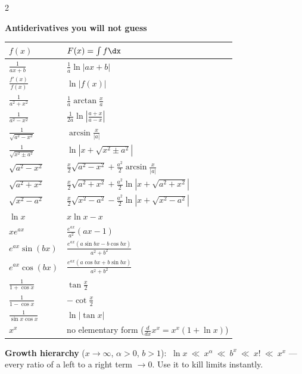 \begin{multicols}{2}
\columnbreak

{\fontsize{6.2pt}{7.3pt}\selectfont
\renewcommand{\arraystretch}{1.12}
\begin{center}
\textbf{\sffamily\color{subText}Antiderivatives you will not guess}\\[1pt]
\begin{tabular}{@{}l|l@{}}
$f(x)$ & $F(x)=\int f\dx$\\
\midrule
$\frac1{ax+b}$ & $\frac1a\ln|ax+b|$\\
$\frac{f'(x)}{f(x)}$ & $\ln|f(x)|$\\
$\frac1{a^2+x^2}$ & $\frac1a\arctan\frac xa$\\
$\frac1{a^2-x^2}$ & $\frac1{2a}\ln\left|\frac{a+x}{a-x}\right|$\\
$\frac1{\sqrt{a^2-x^2}}$ & $\arcsin\frac{x}{|a|}$\\
$\frac1{\sqrt{x^2\pm a^2}}$ & $\ln\left|x+\sqrt{x^2\pm a^2}\right|$\\
$\sqrt{a^2-x^2}$ & $\frac x2\sqrt{a^2-x^2}+\frac{a^2}2\arcsin\frac{x}{|a|}$\\
$\sqrt{a^2+x^2}$ & $\frac x2\sqrt{a^2+x^2}+\frac{a^2}2\ln\left|x+\sqrt{a^2+x^2}\right|$\\
$\sqrt{x^2-a^2}$ & $\frac x2\sqrt{x^2-a^2}-\frac{a^2}2\ln\left|x+\sqrt{x^2-a^2}\right|$\\
$\ln x$ & $x\ln x-x$\\
$x e^{ax}$ & $\frac{e^{ax}}{a^2}(ax-1)$\\
$e^{ax}\sin(bx)$ & $\frac{e^{ax}(a\sin bx-b\cos bx)}{a^2+b^2}$\\
$e^{ax}\cos(bx)$ & $\frac{e^{ax}(a\cos bx+b\sin bx)}{a^2+b^2}$\\
$\frac1{1+\cos x}$ & $\tan\frac x2$\\
$\frac1{1-\cos x}$ & $-\cot\frac x2$\\
$\frac{1}{\sin x\cos x}$ & $\ln|\tan x|$\\
$x^x$ & no elementary form ($\frac{d}{dx}x^x=x^x(1+\ln x)$)\\
\end{tabular}
\end{center}

\textbf{\sffamily\color{subText}Growth hierarchy} ($x\to\infty$, $\alpha>0$, $b>1$):
$\ \ln x\ \ll\ x^{\alpha}\ \ll\ b^{x}\ \ll\ x!\ \ll\ x^{x}$ --- every ratio of a left to a right term $\to0$. Use it to kill limits instantly.

}
\end{multicols}
